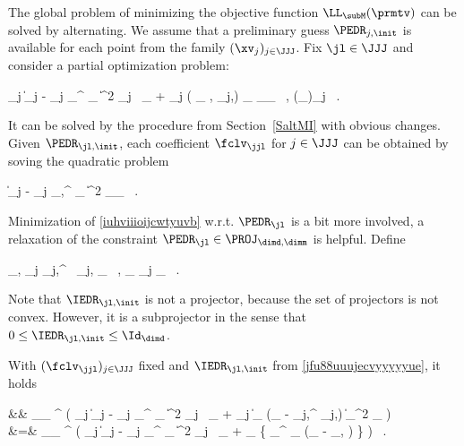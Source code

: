 \label{SmaniEDR}
The global problem of minimizing the objective function \( \LL_{\subM}(\prmtv) \)
can be solved by alternating.
We assume that  
a preliminary guess \( \PEDR_{j,\init} \) is available for each point from the family \( (\xv_{j})_{j \in \JJJ} \).
Fix \( \jl \in \JJJ \) and consider a partial optimization problem:
\begin{EQA}[c]
	\sum_{j \in \JJJ}
	\bigl\| \Imav_{j} - \UV_{j} \PEDR_{\jl}^{\T} \fclv_{\jjl} \bigr\|^{2} \neff_{j} \, \weightM_{\jjl}
	+ \lambda \sum_{j \in \JJJ} \epsilon( \PEDR_{\jl} , \PEDR_{j,\init}) \; \weightM_{\jjl}
	\to \inf_{\PEDR_{\jl} \, , (\fclv_{\jjl})_{j \in \JJJ}}
	\, .
	\qquad
\label{iuhviiioijcwtyuvb}
\end{EQA}
It can be solved by the procedure from Section~\ref{SaltMI}
with obvious changes.
Given \( \PEDR_{\jl,\init} \), each coefficient \( \fclv_{\jjl} \) for \( j \in \JJJ \) can be obtained by soving 
the quadratic problem
\begin{EQA}[c]
	\bigl\| \Imav_{j} - \UV_{j} \PEDR_{\jl,\init}^{\T} \fclv_{\jjl} \bigr\|^{2}
	\to \inf_{\fclv_{\jjl}}
	\, .
	\qquad
\label{kiiilfduy543rbggioe46}
\end{EQA}
Minimization of {\color{blue} \eqref{iuhviiioijcwtyuvb}} w.r.t. \( \PEDR_{\jl} \) is a bit more involved,
a relaxation of the constraint \( \PEDR_{\jl} \in \PROJ_{\dimd,\dimm} \) is helpful.
Define
\begin{EQA}[c]
	\IEDR_{\jl,\init}
	\eqdef
	 \sum_{j \in \JJJ} \PEDR_{j,\init}^{\T} \, \PEDR_{j,\init} \; \weightM_{\jjl}
	\, ,
	\qquad
	\WeightM_{\jl}
	\eqdef
	\sum_{j \in \JJJ} \weightM_{\jjl}	
	\, .
\label{jfu88uuujecvyyyyyue}
\end{EQA}
Note that \( \IEDR_{\jl,\init} \) is not a projector, because the set of projectors is not convex.
However, it is a subprojector in the sense that \( 0 \leq \IEDR_{\jl,\init} \leq \Id_{\dimd} \).



\begin{lemma}
\label{Lmanijjl}
With \( (\fclv_{\jjl})_{j \in \JJJ} \) fixed and \( \IEDR_{\jl,\init} \) from \eqref{jfu88uuujecvyyyyyue}, it holds
\begin{EQA}[rcl]
	&& \nquad
	\arginf_{\BEDR_{\jl} \in \R^{\dimm \times \dimd}} \biggl( 
		\sum_{j \in \JJJ} \bigl\| \Imav_{j} - \UV_{j} \BEDR_{\jl}^{\T} \fclv_{\jjl} \bigr\|^{2} \neff_{j} \, \weightM_{\jjl}
		+ \lambda \sum_{j \in \JJJ} 
			\bigl\| \BEDR_{\jl} (\Id_{\dimd} - \PEDR_{j,\init}^{\T} \PEDR_{j,\init}) \bigr\|_{\Fr}^{2} \; \weightM_{\jjl} 
	\biggr) 
	\\
	&=&
	\arginf_{\BEDR_{\jl} \in \R^{\dimm \times \dimd}} 
	\biggl( \sum_{j \in \JJJ}
		\bigl\| \Imav_{j} - \UV_{j} \BEDR_{\jl}^{\T} \fclv_{\jjl} \bigr\|^{2} \neff_{j} \, \weightM_{\jjl}
		+ \lambda \WeightM_{\jl} \tr \bigl\{ \BEDR_{\jl}^{\T} \BEDR_{\jl} (\Id_{\dimd} - \IEDR_{\jl,\init} ) \bigr\}
	\biggr)
	\, .
	\qquad
\label{iuhviiioijcwtyuvbr}
\end{EQA}
\end{lemma}

